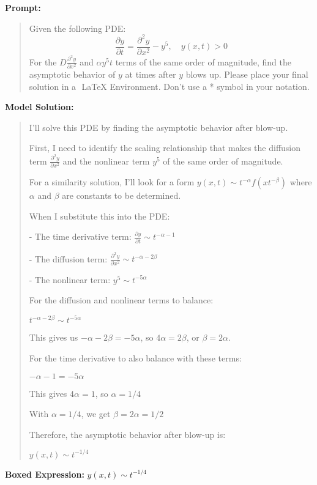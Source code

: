 \documentclass{article}
\begin{document}
\textbf{Prompt:}
\begin{quote}
Given the following PDE:$$\frac{\partial y}{\partial t} = \frac{\partial^2y}{\partial x^2} - y^5, \quad y(x,t)>0$$For the $D\frac{\partial^2y}{\partial x^2}$ and $ \alpha y^5 t$ terms of the same order of magnitude, find the asymptotic behavior of $y$ at times after $y$ blows up. Please place your final solution in a $\boxed{}$ LaTeX Environment. Don't use a * symbol in your notation.
\end{quote}
\textbf{Model Solution:}
\begin{quote}
I'll solve this PDE by finding the asymptotic behavior after blow-up.



First, I need to identify the scaling relationship that makes the diffusion term $\frac{\partial^2y}{\partial x^2}$ and the nonlinear term $y^5$ of the same order of magnitude. 



For a similarity solution, I'll look for a form $y(x,t) \sim t^{-\alpha}f(x t^{-\beta})$ where $\alpha$ and $\beta$ are constants to be determined.



When I substitute this into the PDE:

- The time derivative term: $\frac{\partial y}{\partial t} \sim t^{-\alpha-1}$

- The diffusion term: $\frac{\partial^2y}{\partial x^2} \sim t^{-\alpha-2\beta}$

- The nonlinear term: $y^5 \sim t^{-5\alpha}$



For the diffusion and nonlinear terms to balance:

$t^{-\alpha-2\beta} \sim t^{-5\alpha}$



This gives us $-\alpha-2\beta = -5\alpha$, so $4\alpha = 2\beta$, or $\beta = 2\alpha$.



For the time derivative to also balance with these terms:

$-\alpha-1 = -5\alpha$

This gives $4\alpha = 1$, so $\alpha = 1/4$



With $\alpha = 1/4$, we get $\beta = 2\alpha = 1/2$



Therefore, the asymptotic behavior after blow-up is:



$\boxed{y(x,t) \sim t^{-1/4}}$
\end{quote}
\textbf{Boxed Expression:} $y(x,t) \sim t^{-1/4}$
\end{document}
